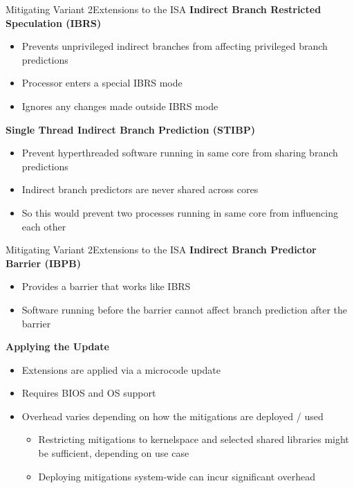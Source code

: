\documentclass[10pt, dvipsnames, aspectratio=169]{beamer}
\begin{document}
\begin{frame}[c]{Mitigating Variant 2}{Extensions to the ISA}
  {\bf Indirect Branch Restricted Speculation (IBRS)}
  \begin{itemize}
    \item Prevents unprivileged indirect branches from affecting privileged branch predictions
    \item Processor enters a special IBRS mode
    \item Ignores any changes made outside IBRS mode
  \end{itemize}

  \vfill
  {\bf Single Thread Indirect Branch Prediction (STIBP)}
  \begin{itemize}
    \item Prevent hyperthreaded software running in same core from sharing branch predictions
    \item Indirect branch predictors are never shared across cores~\cite{intel_stibp}
    \item So this would prevent two processes running in same core from influencing each other
  \end{itemize}
\end{frame}

\begin{frame}[c]{Mitigating Variant 2}{Extensions to the ISA}
  {\bf Indirect Branch Predictor Barrier (IBPB)}
  \begin{itemize}
    \item Provides a barrier that works like IBRS
    \item Software running before the barrier cannot affect branch prediction after the barrier
  \end{itemize}

  \vfill
  {\bf Applying the Update}
  \begin{itemize}
    \item Extensions are applied via a microcode update
    \item Requires BIOS and OS support
    \item Overhead varies depending on how the mitigations are deployed / used
    \begin{itemize}
      \item Restricting mitigations to kernelspace and selected shared libraries might be sufficient, depending on use case
      \item Deploying mitigations system-wide can incur significant overhead
    \end{itemize}
  \end{itemize}
\end{frame}
\end{document}
